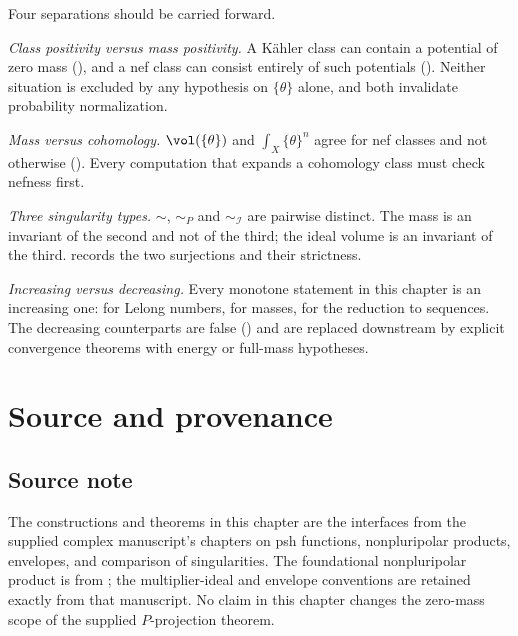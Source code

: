 Four separations should be carried forward.

\emph{Class positivity versus mass positivity.}  A K\"ahler class can
contain a potential of zero mass (), and a nef
class can consist entirely of such potentials
().  Neither situation is excluded by any
hypothesis on \(\{\theta\}\) alone, and both invalidate probability
normalization.

\emph{Mass versus cohomology.}  \(\vol(\{\theta\})\) and
\(\int_X\{\theta\}^n\) agree for nef classes and not otherwise
().  Every computation that expands a
cohomology class must check nefness first.

\emph{Three singularity types.}  \(\sim\), \(\sim_P\) and
\(\sim_{\mathcal I}\) are pairwise distinct.  The mass is an invariant of
the second and not of the third; the ideal volume is an invariant of the
third.   records the two surjections and
 their strictness.

\emph{Increasing versus decreasing.}  Every monotone statement in this
chapter is an increasing one:  for
Lelong numbers,  for masses,
 for the reduction to sequences.  The decreasing
counterparts are false
() and are
replaced downstream by explicit convergence theorems with energy or
full-mass hypotheses.

\section{Source and provenance}
\label{sec:ch51-source}

\subsection{Source note}
\label{sec:ch51-source-note}

\begin{remark}
\label{rem:complex-prerequisites-source}
The constructions and theorems in this chapter are the interfaces from
the supplied complex manuscript's chapters on psh functions,
nonpluripolar products, envelopes, and comparison of singularities.
The foundational nonpluripolar product is from \cite{BEGZ10};
the multiplier-ideal and envelope conventions are retained exactly from
that manuscript.  No claim in this chapter changes the zero-mass scope
of the supplied \(P\)-projection theorem.
\end{remark}

